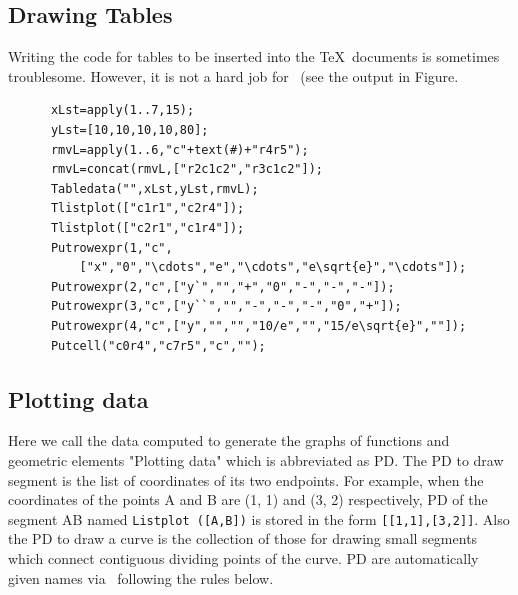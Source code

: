 \documentclass[papersize,a4paper,12pt]{article}
\begin{document}
\subsection{Drawing Tables}
Writing the code for tables to be inserted into the \TeX\ documents is sometimes troublesome.
However, it is not a hard job for \ketcindy\ (see the output in Figure.

\begin{verbatim}
      xLst=apply(1..7,15);
      yLst=[10,10,10,10,80];
      rmvL=apply(1..6,"c"+text(#)+"r4r5");
      rmvL=concat(rmvL,["r2c1c2","r3c1c2"]);
      Tabledata("",xLst,yLst,rmvL);
      Tlistplot(["c1r1","c2r4"]);
      Tlistplot(["c2r1","c1r4"]);
      Putrowexpr(1,"c",
          ["x","0","\cdots","e","\cdots","e\sqrt{e}","\cdots"]);
      Putrowexpr(2,"c",["y`","","+","0","-","-","-"]);
      Putrowexpr(3,"c",["y``","","-","-","-","0","+"]);
      Putrowexpr(4,"c",["y","","","10/e","","15/e\sqrt{e}",""]);
      Putcell("c0r4","c7r5","c","");
\end{verbatim}

\vspace{2mm}

\begin{center}

\end{center}


\newpage

\subsection{Plotting data}
Here we call the data computed 
to generate the graphs of functions and geometric elements 
"Plotting data" which is abbreviated as PD. 
The PD to draw segment is the list of coordinates 
of its two endpoints. 
For example, 
when the coordinates of the points A and B 
are (1, 1) and (3, 2) respectively, 
PD of the segment AB named \verb|Listplot ([A,B])| 
is stored in the form \verb|[[1,1],[3,2]]|. 
Also the PD to draw a curve is the collection of 
those for drawing small segments 
which connect contiguous dividing points of the curve. 
PD are automatically given names via \ketcindy\ 
following the rules below.
\end{document}
